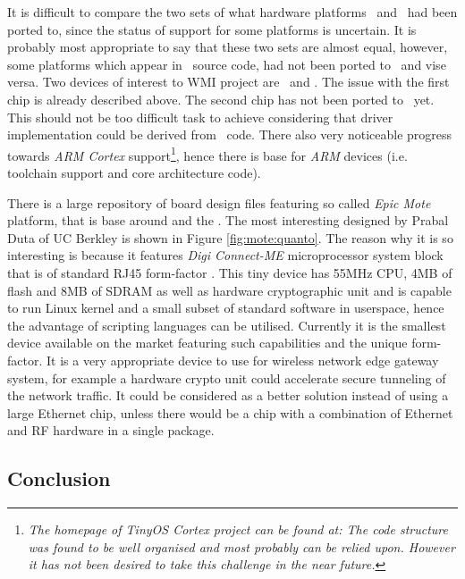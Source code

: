   It is difficult to compare the two sets of what hardware platforms
 \TinyOS\ and \Contiki\ had been ported to, since the status of support
 for some platforms is uncertain. It is probably most appropriate to
 say that these two sets are almost equal, however, some platforms
 which appear in \Contiki\ source code, had not been ported to \TinyOS\
 and vise versa. Two devices of interest to WMI project are \RFA\ and
 \MCX. The issue with the first chip is already described above.
 The second chip has not been ported to \TinyOS\ yet. This should not
 be too difficult task to achieve considering that driver implementation
 could be derived from \Contiki\ code. There also very noticeable
 progress towards \emph{ARM Cortex} support\footnote{\emph{The homepage
 of TinyOS Cortex project can be found at:
 The code structure was found to be well organised and most probably
 can be relied upon. However it has not been desired to take this
 challenge in the near future.}}, hence there is base for \emph{ARM}
 devices (i.e. toolchain support and core architecture code).
 

  There is a large repository of board design files featuring so called
 \emph{Epic Mote} platform, that is base around \Chip{CC2420} and the
 \Chip{MSP430} \cite{epic:homepage}. The most interesting designed by
 Prabal Duta of UC Berkley \cite{duta:homepage} is shown in Figure
 \ref{fig:mote:quanto}. The reason why it is so interesting is because
 it features \emph{Digi Connect-ME} microprocessor system block that is
 of standard RJ45 form-factor \cite{digi:connect-me}. This tiny device
 has 55MHz \Chip{ARM7TDMI} CPU, 4MB of flash and 8MB of SDRAM as well as
 hardware cryptographic unit and is capable to run Linux kernel and a
 small subset of standard software in userspace, hence the advantage of
 scripting languages can be utilised. Currently it is the smallest
 device available on the market featuring such capabilities and
 the unique form-factor. It is a very appropriate device to use for
 wireless network edge gateway system, for example a hardware crypto
 unit could accelerate secure tunneling of the network traffic. It
 could be considered as a better solution instead of using a large
 Ethernet chip, unless there would be a chip with a combination of
 Ethernet and RF hardware in a single package.



\subsection{Conclusion}

